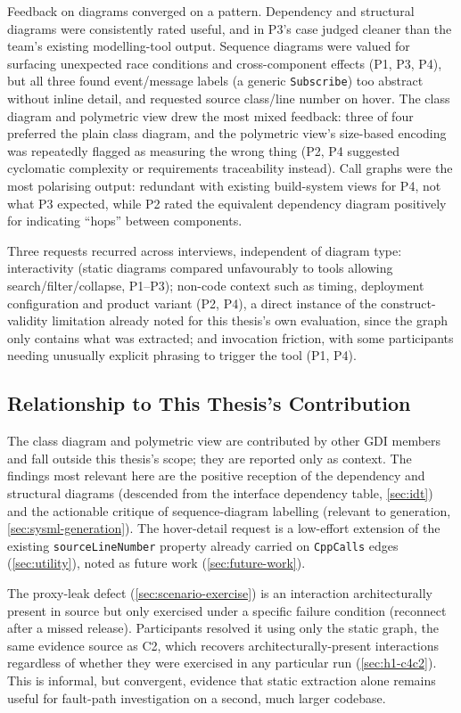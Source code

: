 Feedback on diagrams converged on a pattern. Dependency and structural
diagrams were consistently rated useful, and in P3's case judged cleaner
than the team's existing modelling-tool output. Sequence diagrams were
valued for surfacing unexpected race conditions and cross-component
effects (P1, P3, P4), but all three found event/message labels (\eg a
generic \texttt{Subscribe}) too abstract without inline detail, and
requested source class/line number on hover. The class diagram and
polymetric view drew the most mixed feedback: three of four preferred
the plain class diagram, and the polymetric view's size-based encoding
was repeatedly flagged as measuring the wrong thing (P2, P4 suggested
cyclomatic complexity or requirements traceability instead). Call graphs
were the most polarising output: redundant with existing build-system
views for P4, not what P3 expected, while P2 rated the equivalent
dependency diagram positively for indicating ``hops'' between
components.

Three requests recurred across interviews, independent of diagram type:
interactivity (static diagrams compared unfavourably to tools allowing
search/filter/collapse, P1--P3); non-code context such as timing,
deployment configuration and product variant (P2, P4), a direct
instance of the construct-validity limitation already noted for this
thesis's own evaluation, since the graph
only contains what was extracted; and invocation friction, with some
participants needing unusually explicit phrasing to trigger the tool
(P1, P4).

\subsection{Relationship to This Thesis's Contribution}

The class diagram and polymetric view are contributed by other \ac{GDI}
members and fall outside this thesis's scope; they are reported only as
context. The findings most relevant here are the positive reception of
the dependency and structural diagrams (descended from the interface
dependency table, \cref{sec:idt}) and the actionable critique of
sequence-diagram labelling (relevant to \sysml generation,
\cref{sec:sysml-generation}). The hover-detail request is a low-effort
extension of the existing \texttt{sourceLineNumber} property already
carried on \texttt{CppCalls} edges (\cref{sec:utility}), noted as future
work (\cref{sec:future-work}).

The proxy-leak defect (\cref{sec:scenario-exercise}) is an interaction
architecturally present in source but only exercised under a specific
failure condition (reconnect after a missed release). Participants
resolved it using only the static graph, the same evidence source as
C2, which recovers architecturally-present interactions regardless of
whether they were exercised in any particular run
(\cref{sec:h1-c4c2}). This is informal, but convergent, evidence that
static extraction alone remains useful for fault-path investigation on a
second, much larger codebase.

